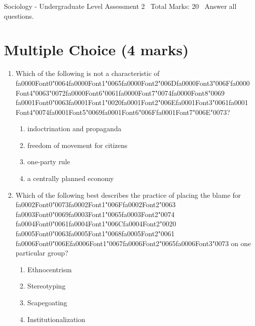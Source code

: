 \documentclass[12pt]{article}
\begin{document}
\begin{center}
Sociology - Undergraduate Level Assessment 2 \
Total Marks: 20 \
Answer all questions.
\end{center}

\section*{Multiple Choice (4 marks)}
\begin{enumerate}[label=\arabic*.]
\item Which of the following is not a characteristic of {\csname fa0000Font0\endcsname\char"0064}{\csname fa0000Font1\endcsname\char"0065}{\csname fa0000Font2\endcsname\char"006D}{\csname fa0000Font3\endcsname\char"006F}{\csname fa0000Font4\endcsname\char"0063}{\char"0072}{\csname fa0000Font6\endcsname\char"0061}{\csname fa0000Font7\endcsname\char"0074}{\csname fa0000Font8\endcsname\char"0069} {\csname fa0001Font0\endcsname\char"0063}{\csname fa0001Font1\endcsname\char"0020}{\csname fa0001Font2\endcsname\char"006E}{\csname fa0001Font3\endcsname\char"0061}{\csname fa0001Font4\endcsname\char"0074}{\csname fa0001Font5\endcsname\char"0069}{\csname fa0001Font6\endcsname\char"006F}{\csname fa0001Font7\endcsname\char"006E}{\char"0073}?
\begin{enumerate}[label=(\alph*)]
    \item indoctrination and propaganda
    \item freedom of movement for citizens
    \item one-party rule
    \item a centrally planned economy
\end{enumerate}
\item Which of the following best describes the practice of placing the blame for {\csname fa0002Font0\endcsname\char"0073}{\csname fa0002Font1\endcsname\char"006F}{\csname fa0002Font2\endcsname\char"0063} {\csname fa0003Font0\endcsname\char"0069}{\csname fa0003Font1\endcsname\char"0065}{\csname fa0003Font2\endcsname\char"0074} {\csname fa0004Font0\endcsname\char"0061}{\csname fa0004Font1\endcsname\char"006C}{\csname fa0004Font2\endcsname\char"0020} {\csname fa0005Font0\endcsname\char"0063}{\csname fa0005Font1\endcsname\char"0068}{\csname fa0005Font2\endcsname\char"0061} {\csname fa0006Font0\endcsname\char"006E}{\csname fa0006Font1\endcsname\char"0067}{\csname fa0006Font2\endcsname\char"0065}{\csname fa0006Font3\endcsname\char"0073} on one particular group?
\begin{enumerate}[label=(\alph*)]
    \item Ethnocentrism
    \item Stereotyping
    \item Scapegoating
    \item Institutionalization
\end{enumerate}
\end{enumerate}
\end{document}
